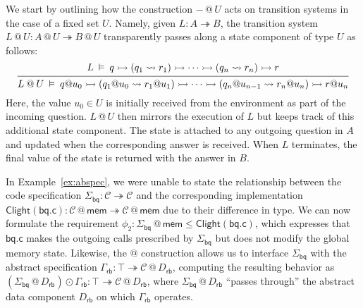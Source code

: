 \documentclass[acmsmall,screen,review,anonymous]{acmart}
\newcommand{\kw}[1]{\ensuremath{ \mathsf{#1} }}
\begin{document}
We start by
outlining how the construction ${-} \mathbin@ U$
acts on transition systems
in the case of a fixed set $U$.
Namely,
given $L : A \twoheadrightarrow B$,
the transition system
$
  L \mathbin@ U : A \mathbin@ U \twoheadrightarrow B \mathbin@ U
$
transparently passes along
a state component of type $U$ as follows:
\begin{equation} \label{eqn:slift}
  \begin{prooftree}
  \hypo{
  L \:\vDash\: q \rightarrowtail
    (q_1 \leadsto r_1) \rightarrowtail
    \cdots \rightarrowtail
    (q_n \leadsto r_n) \rightarrowtail
    r
  }
  \infer1{
  L \mathbin@ U \:\vDash\: q@u_0 \rightarrowtail
    (q_1@u_0 \leadsto r_1@u_1) \rightarrowtail
    \cdots \rightarrowtail
    (q_n@u_{n-1} \leadsto r_n@u_n) \rightarrowtail
    r@u_n
  }
  \end{prooftree}
\end{equation}
Here, the value $u_0 \in U$
is initially received from the environment as part of the incoming question.
$L \mathbin@ U$ then mirrors the execution of $L$
but keeps track of this additional state component.
The state is attached to any outgoing question in $A$
and updated when the corresponding answer is received.
When $L$ terminates,
the final value of the state is returned with the answer in $B$.

\begin{example} \label{ex:abspeclift} %
In Example~\ref{ex:abspec},
we were unable to state the relationship
between the code specification
$\Sigma_\kw{bq} : \mathcal{C} \twoheadrightarrow \mathcal{C}$
and the corresponding implementation
$\kw{Clight}(\kw{bq.c}) : \mathcal{C} \mathbin@ \kw{mem}
 \twoheadrightarrow \mathcal{C} \mathbin@ \kw{mem}$
due to their difference in type.
We can now formulate the requirement
$
  \phi_2 : \Sigma_\kw{bq} \mathbin@ \kw{mem} \le \kw{Clight}(\kw{bq.c})
$,
which expresses that $\kw{bq.c}$
makes the outgoing calls prescribed by $\Sigma_\kw{bq}$
but does not modify the global memory state.
Likewise,
the $@$ construction allows us to interface $\Sigma_\kw{bq}$
with the abstract specification
$\Gamma_\kw{rb} : \top \twoheadrightarrow \mathcal{C} \mathbin@ D_\kw{rb}$,
computing the resulting behavior as
$
  (\Sigma_\kw{bq} \mathbin@ D_\kw{rb}) \odot \Gamma_\kw{rb} :
  \top \twoheadrightarrow \mathcal{C} \mathbin@ D_\kw{rb}
$,
where $\Sigma_\kw{bq} \mathbin@ D_\kw{rb}$
``passes through'' the abstract data component $D_\kw{rb}$
on which $\Gamma_\kw{rb}$ operates.
\end{example}
\end{document}
